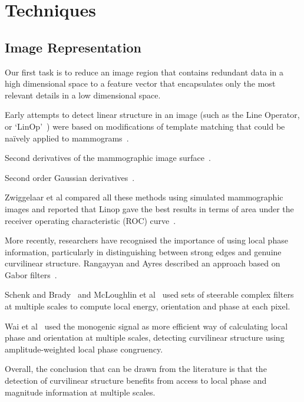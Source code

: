 \chapter{Techniques}

\section{Image Representation}
\label{s:filtering}
Our first task is to reduce an image region that contains redundant data in a high dimensional space to a feature vector that encapsulates only the most relevant details in a low dimensional space.



Early attempts to detect linear structure in an image (such as the Line Operator, or `LinOp'~\cite{Dixon_Taylor_IPC79}) were based on modifications of template matching that could be na\"ively applied to mammograms~\cite{Parr_etal_SPIE97}.

Second derivatives of the mammographic image surface~\cite{Cerneaz_Brady_CVVRRM95}. 

Second order Gaussian derivatives~\cite{Karssemeijer_teBrake_TMI96}. 

Zwiggelaar et al compared all these methods using simulated mammographic images and reported that Linop gave the best results in terms of area under the receiver operating characteristic (ROC) curve~\cite{Zwiggelaar_etal_TMI04}. 

More recently, researchers have recognised the importance of using local phase information, particularly in distinguishing between strong edges and genuine curvilinear structure. Rangayyan and Ayres described an approach based on Gabor filters~\cite{Rangayyan_Ayres_MBEC06}. 

Schenk and Brady~\cite{Schenk_Brady_IWDM02} and McLoughlin et al~\cite{McLoughlin_etal_SPIE02} used sets of steerable complex filters~\cite{Freeman_Adelson_TPAMI91} at multiple scales to compute local energy, orientation and phase at each pixel. 

Wai et al~\cite{Wai_etal_MICCAI04} used the monogenic signal as more efficient way of calculating local phase and orientation at multiple scales, detecting curvilinear structure using amplitude-weighted local phase congruency. 

Overall, the conclusion that can be drawn from the literature is that the detection of curvilinear structure benefits from access to local phase and magnitude information at multiple scales.

